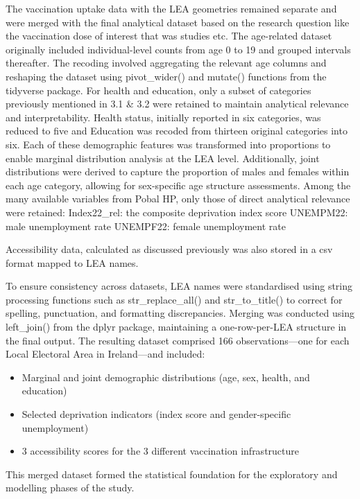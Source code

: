 \documentclass{article}
\providecommand{\tightlist}{%
  \setlength{\itemsep}{0pt}\setlength{\parskip}{0pt}}
\begin{document}
The vaccination uptake data with the LEA geometries remained separate
and were merged with the final analytical dataset based on the research
question like the vaccination dose of interest that was studies etc. The
age-related dataset originally included individual-level counts from age
0 to 19 and grouped intervals thereafter. The recoding involved
aggregating the relevant age columns and reshaping the dataset using
pivot\_wider() and mutate() functions from the tidyverse package. For
health and education, only a subset of categories previously mentioned
in 3.1 \& 3.2 were retained to maintain analytical relevance and
interpretability. Health status, initially reported in six categories,
was reduced to five and Education was recoded from thirteen original
categories into six. Each of these demographic features was transformed
into proportions to enable marginal distribution analysis at the LEA
level. Additionally, joint distributions were derived to capture the
proportion of males and females within each age category, allowing for
sex-specific age structure assessments. Among the many available
variables from Pobal HP, only those of direct analytical relevance were
retained: Index22\_rel: the composite deprivation index score UNEMPM22:
male unemployment rate UNEMPF22: female unemployment rate

Accessibility data, calculated as discussed previously was also stored
in a csv format mapped to LEA names.

To ensure consistency across datasets, LEA names were standardised using
string processing functions such as str\_replace\_all() and
str\_to\_title() to correct for spelling, punctuation, and formatting
discrepancies. Merging was conducted using left\_join() from the dplyr
package, maintaining a one-row-per-LEA structure in the final output.
The resulting dataset comprised 166 observations---one for each Local
Electoral Area in Ireland---and included:

\begin{itemize}
\tightlist
\item
  Marginal and joint demographic distributions (age, sex, health, and
  education)
\item
  Selected deprivation indicators (index score and gender-specific
  unemployment)
\item
  3 accessibility scores for the 3 different vaccination infrastructure
\end{itemize}

This merged dataset formed the statistical foundation for the
exploratory and modelling phases of the study.
\end{document}
